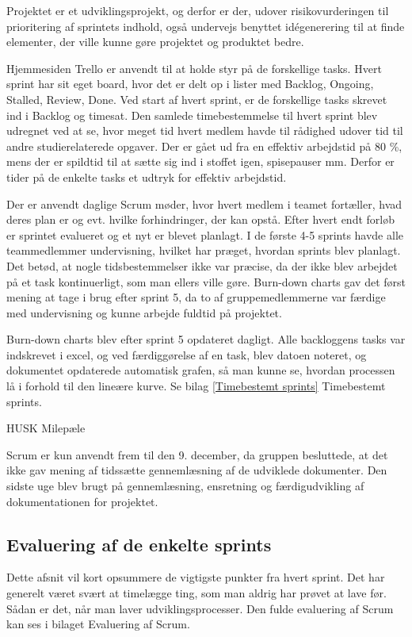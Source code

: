 Projektet er et udviklingsprojekt, og derfor er der, udover risikovurderingen til prioritering af sprintets indhold, også undervejs benyttet idégenerering til at finde elementer, der ville kunne gøre projektet og produktet bedre. 

Hjemmesiden Trello er anvendt til at holde styr på de forskellige tasks. Hvert sprint har sit eget board, hvor det er delt op i lister med Backlog, Ongoing, Stalled, Review, Done. Ved start af hvert sprint, er de forskellige tasks skrevet ind i Backlog og timesat. Den samlede timebestemmelse til hvert sprint blev udregnet ved at se, hvor meget tid hvert medlem havde til rådighed udover tid til andre studierelaterede opgaver. Der er gået ud fra en effektiv arbejdstid på 80 \%, mens der er spildtid til at sætte sig ind i stoffet igen, spisepauser mm. Derfor er tider på de enkelte tasks et udtryk for effektiv arbejdstid. 

Der er anvendt daglige Scrum møder, hvor hvert medlem i teamet fortæller, hvad deres plan er og evt. hvilke forhindringer, der kan opstå. Efter hvert endt forløb er sprintet evalueret og et nyt er blevet planlagt. I de første 4-5 sprints havde alle teammedlemmer undervisning, hvilket har præget, hvordan sprints blev planlagt. Det betød, at nogle tidsbestemmelser ikke var præcise, da der ikke blev arbejdet på et task kontinuerligt, som man ellers ville gøre. Burn-down charts gav det først mening at tage i brug efter sprint 5, da to af gruppemedlemmerne var færdige med undervisning og kunne arbejde fuldtid på projektet. 

Burn-down charts blev efter sprint 5 opdateret dagligt. Alle backloggens tasks var indskrevet i excel, og ved færdiggørelse af en task, blev datoen noteret, og dokumentet opdaterede automatisk grafen, så man kunne se, hvordan processen lå i forhold til den lineære kurve. Se bilag \ref{Timebestemt sprints} Timebestemt sprints. 

HUSK Milepæle

Scrum er kun anvendt frem til den 9. december, da gruppen besluttede, at det ikke gav mening af tidssætte gennemlæsning af de udviklede dokumenter. Den sidste uge blev brugt på gennemlæsning, ensretning og færdigudvikling af dokumentationen for projektet.  


\subsection{Evaluering af de enkelte sprints} 
 Dette afsnit vil kort opsummere de vigtigste punkter fra hvert sprint. Det har generelt været svært at timelægge ting, som man aldrig har prøvet at lave før. Sådan er det, når man laver udviklingsprocesser. Den fulde evaluering af Scrum kan ses i bilaget Evaluering af Scrum.

